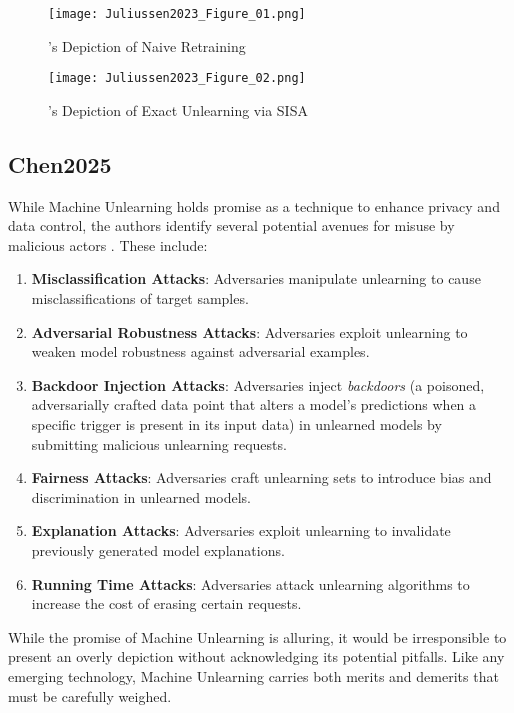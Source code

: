         \begin{figure}[H]
            \centering
            \texttt{[image: Juliussen2023\_Figure\_01.png]}
            \caption{\cite{Juliussen2023}'s Depiction of Naive Retraining}
        \end{figure}
        
        \begin{figure}[H]
            \centering
            \texttt{[image: Juliussen2023\_Figure\_02.png]}
            \caption{\cite{Juliussen2023}'s Depiction of Exact Unlearning via SISA}
        \end{figure}

    \subsection{Chen2025}
    \label{subsec:Chen2025}

        While Machine Unlearning holds promise as a technique to enhance privacy and data control, the authors identify several potential avenues for misuse by malicious actors \cite{Chen2025}. These include:
        
        \begin{enumerate}[label=(Atk. \arabic*):, left=2em]
            \item \textbf{Misclassification Attacks}: Adversaries manipulate unlearning to cause misclassifications of target samples.
            \item \textbf{Adversarial Robustness Attacks}: Adversaries exploit unlearning to weaken model robustness against adversarial examples.
            \item \textbf{Backdoor Injection Attacks}: Adversaries inject \textit{backdoors} (a poisoned, adversarially crafted data point that alters a model's predictions when a specific trigger is present in its input data) in unlearned models by submitting malicious unlearning requests.
            \item \textbf{Fairness Attacks}: Adversaries craft unlearning sets to introduce bias and discrimination in unlearned models.
            \item \textbf{Explanation Attacks}: Adversaries exploit unlearning to invalidate previously generated model explanations.
            \item \textbf{Running Time Attacks}: Adversaries attack unlearning algorithms to increase the cost of erasing certain requests.
        \end{enumerate}
        
        While the promise of Machine Unlearning is alluring, it would be irresponsible to present an overly  depiction without acknowledging its potential pitfalls. Like any emerging technology, Machine Unlearning carries both merits and demerits that must be carefully weighed.